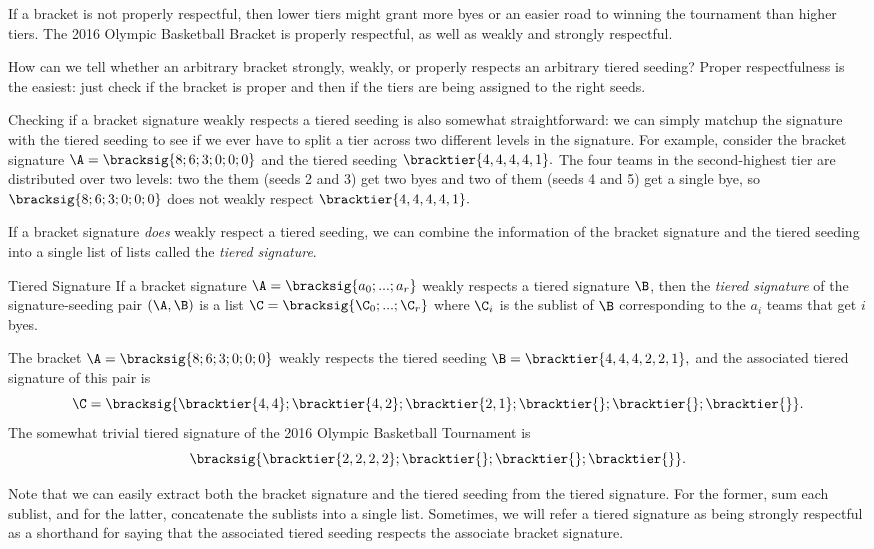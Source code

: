 {    If a bracket is not properly respectful, then lower tiers might grant more byes or an easier road to winning the tournament than higher tiers. The 2016 Olympic Basketball Bracket is properly respectful, as well as weakly and strongly respectful.

    How can we tell whether an arbitrary bracket strongly, weakly, or properly respects an arbitrary tiered seeding?  Proper respectfulness is the easiest: just check if the bracket is proper and then if the tiers are being assigned to the right seeds.

    Checking if a bracket signature weakly respects a tiered seeding is also somewhat straightforward: we can simply matchup the signature with the tiered seeding to see if we ever have to split a tier across two different levels in the signature. For example, consider the bracket signature $\A = \bracksig{8;6;3;0;0;0}$ and the tiered seeding $\bracktier{4,4,4,4,1}.$ The four teams in the second-highest tier are distributed over two levels: two the them (seeds 2 and 3) get two byes and two of them (seeds 4 and 5) get a single bye, so $\bracksig{8;6;3;0;0;0}$ does not weakly respect $\bracktier{4,4,4,4,1}.$


    If a bracket signature \textit{does} weakly respect a tiered seeding, we can combine the information of the bracket signature and the tiered seeding into a single list of lists called the \textit{tiered signature}.

    \begin{definition}{Tiered Signature}{}
        If a bracket signature $\A = \bracksig{a_0; ...; a_r}$ weakly respects a tiered signature $\B$, then the \textit{tiered signature} of the signature-seeding pair $(\A, \B)$ is a list $\C = \bracksig{\C_0; ...; \C_r}$ where $\C_i$ is the sublist of $\B$ corresponding to the $a_i$ teams that get $i$ byes.
    \end{definition}

    The bracket $\A = \bracksig{8;6;3;0;0;0}$ weakly respects the tiered seeding $\B = \bracktier{4,4,4,2,2,1},$ and the associated tiered signature of this pair is $$\C = \bracksig{\bracktier{4, 4};\bracktier{4,2};\bracktier{2,1};\bracktier{};\bracktier{};\bracktier{}}.$$ The somewhat trivial tiered signature of the 2016 Olympic Basketball Tournament is $$\bracksig{\bracktier{2, 2, 2, 2};\bracktier{};\bracktier{};\bracktier{}}.$$

    Note that we can easily extract both the bracket signature and the tiered seeding from the tiered signature. For the former, sum each sublist, and for the latter, concatenate the sublists into a single list. Sometimes, we will refer a tiered signature as being strongly respectful as a shorthand for saying that the associated tiered seeding respects the associate bracket signature.

}
